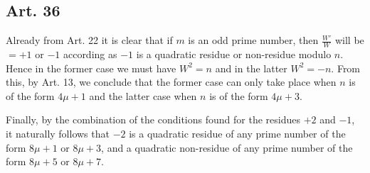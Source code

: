 \documentclass{book}
\theoremstyle{plain}
\theoremstyle{remark}
\begin{document}
\subsection*{Art. 36}

Already from Art. 22 it is clear that if $m$ is an odd prime number, then $\frac{W'}{W}$ will be $=+1$ or $-1$ according as $-1$ is a quadratic residue or non-residue modulo $n$.  Hence in the former case we must have $W^2=n$ and in the latter $W^2 = -n$.  From this, by Art. 13, we conclude that the former case can only take place when $n$ is of the form $4\mu+1$ and the latter case when $n$ is of the form $4\mu+3$.   

Finally, by the combination of the conditions found for the residues $+2$ and $-1$, it naturally follows that $-2$ is a quadratic residue of any prime number of the form $8\mu+1$ or $8\mu+3$, and a quadratic non-residue of any prime number of the form $8\mu+5$ or $8\mu+7$.
\end{document}

